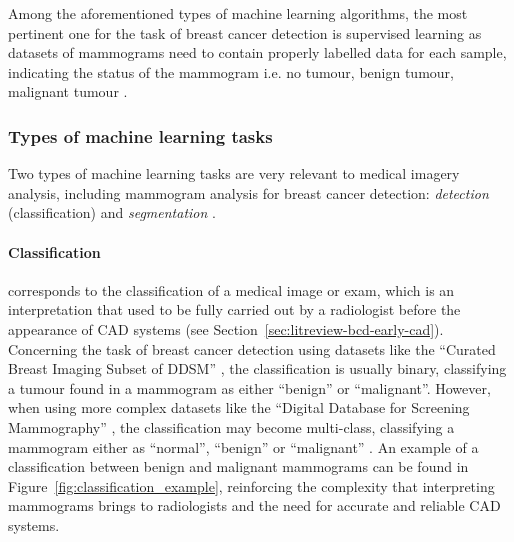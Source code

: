 Among the aforementioned types of machine learning algorithms, the most pertinent one for the task of breast cancer detection is supervised learning as datasets of mammograms need to contain properly labelled data for each sample, indicating the status of the mammogram i.e. no tumour, benign tumour, malignant tumour \cite{Shen2017}.

\subsubsection{Types of machine learning tasks}

Two types of machine learning tasks are very relevant to medical imagery analysis, including mammogram analysis for breast cancer detection: \textit{detection} (classification) and \textit{segmentation} \cite{Litjens2017}. 

\paragraph{Classification} corresponds to the classification of a medical image or exam, which is an interpretation that used to be fully carried out by a radiologist before the appearance of CAD systems (see Section~\ref{sec:litreview-bcd-early-cad}). Concerning the task of breast cancer detection using datasets like the ``Curated Breast Imaging Subset of DDSM'' \cite{Lee2017}, the classification is usually binary, classifying a tumour found in a mammogram as either ``benign'' or ``malignant''. However, when using more complex datasets like the ``Digital Database for Screening Mammography'' \cite{DDSMdataset2001}, the classification may become multi-class, classifying a mammogram either as ``normal'', ``benign'' or ``malignant'' \cite{Litjens2017}. An example of a classification between benign and malignant mammograms can be found in Figure~\ref{fig:classification_example}, reinforcing the complexity that interpreting mammograms brings to radiologists and the need for accurate and reliable CAD systems.

